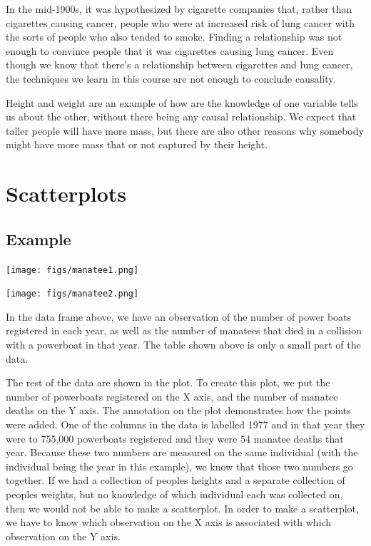 \documentclass[
  letterpaper,
  DIV=11,
  numbers=noendperiod]{scrreprt}
\begin{document}
In the mid-1900s, it was hypothesized by cigarette companies that,
rather than cigarettes causing cancer, people who were at increased risk
of lung cancer with the sorts of people who also tended to smoke.
Finding a relationship was not enough to convince people that it was
cigarettes causing lung cancer. Even though we know that there's a
relationship between cigarettes and lung cancer, the techniques we learn
in this course are not enough to conclude causality.

Height and weight are an example of how are the knowledge of one
variable tells us about the other, without there being any causal
relationship. We expect that taller people will have more mass, but
there are also other reasons why somebody might have more mass that or
not captured by their height.

\hypertarget{scatterplots}{%
\chapter{Scatterplots}\label{scatterplots}}

\hypertarget{example}{%
\section{Example}\label{example}}

\texttt{[image: figs/manatee1.png]}

\texttt{[image: figs/manatee2.png]}

In the data frame above, we have an observation of the number of power
boats registered in each year, as well as the number of manatees that
died in a collision with a powerboat in that year. The table shown above
is only a small part of the data.

The rest of the data are shown in the plot. To create this plot, we put
the number of powerboats registered on the X axis, and the number of
manatee deaths on the Y axis. The annotation on the plot demonstrates
how the points were added. One of the columns in the data is labelled
1977 and in that year they were to 755,000 powerboats registered and
they were 54 manatee deaths that year. Because these two numbers are
measured on the same individual (with the individual being the year in
this example), we know that those two numbers go together. If we had a
collection of peoples heights and a separate collection of peoples
weights, but no knowledge of which individual each was collected on,
then we would not be able to make a scatterplot. In order to make a
scatterplot, we have to know which observation on the X axis is
associated with which observation on the Y axis.
\end{document}
